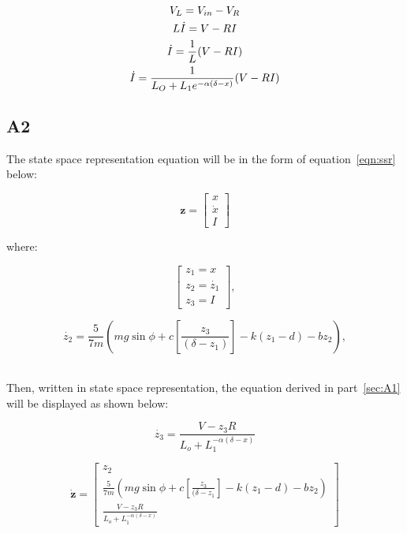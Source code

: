 \documentclass[a4paper,10pt,reqno]{amsart}
\numberwithin{equation}{section}
\begin{document}
\begin{gather}
    V_L=V_{in}-V_R
    \notag\\
    L\dot{I}=V-RI
    \notag\\
    \dot{I}=\frac{1}{L}(V-RI)
    \notag\\
    \dot{I}=\frac{1}{L_O+L_1e^{-\alpha(\delta-x)}}(V-RI)
\end{gather}

\subsection{A2}\label{sec:A2}

\par The state space representation equation will be in the form of equation~\ref{eqn:ssr} below:

\begin{equation}
\label{eqn:ssr}
\bm{z}=
\begin{bmatrix}
x
\\
\dot{x}
\\
I
\end{bmatrix}
\end{equation}

\par where:

\begin{equation}
\begin{bmatrix}
z_1=x
\\
z_2=\dot{z_1}
\\
z_3=I
\end{bmatrix},
\end{equation}

\begin{equation}
    \dot{z_2}=\frac{5}{7m}(mg\sin{\phi}+c[\frac{z_3}{(\delta-z_1)}]-k(z_1-d)-bz_2),
\end{equation}
\\
\par Then, written in state space representation, the equation derived in part~\ref{sec:A1} will be displayed as shown below:

\begin{equation}
    \dot{z_3}=\frac{V-z_3R}{L_o+L_1^{-\alpha(\delta-x)}}
\end{equation}



\begin{equation}
\bm{\dot{z}}=
\begin{bmatrix}
z_2
\\
\frac{5}{7m}(mg\sin{\phi}+c[\frac{z_3}{(\delta-z_1}]-k(z_1-d)-bz_2)
\\
\frac{V-z_3R}{L_o+L_1^{-\alpha(\delta-x)}}
\end{bmatrix}
\end{equation}
\end{document}
